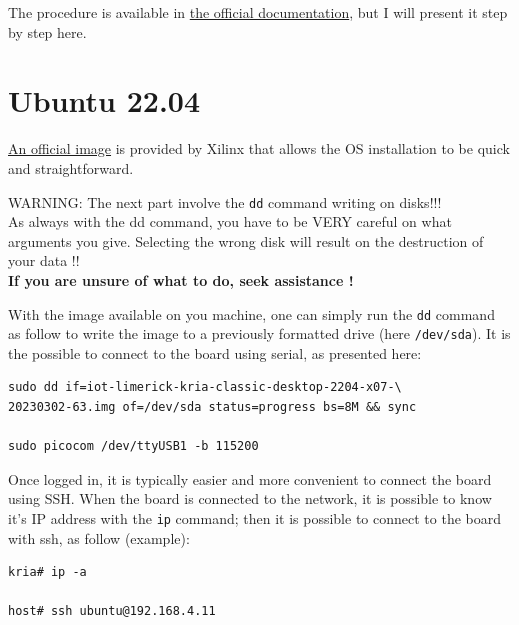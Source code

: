\documentclass[10pt]{article}
\begin{document}
The procedure is available in \href{https://docs.xilinx.com/r/en-US/ug1089-kv260-starter-kit/Firmware-Update}{the official documentation},
but I will present it step by step here.

\section{Ubuntu 22.04}
\label{sec:ubuntu-22.04}
\href{https://ubuntu.com/download/amd-xilinx}{An official image} is provided by Xilinx that allows the OS installation to be quick and
straightforward.

\begin{tcolorbox}[colback=red!5!white,colframe=red!75!black]
  WARNING: The next part involve the \verb|dd| command writing on disks!!! \\
  As always with the dd command, you have to be VERY careful on what arguments you give. Selecting the wrong disk will result on the destruction of your data !! \\
  \textbf{If you are unsure of what to do, seek assistance !}
\end{tcolorbox}


With the image available on you machine, one can simply run the \verb|dd| command as follow to write the image to a
previously formatted drive (here \verb|/dev/sda|). It is the possible to connect to the board using serial, as presented here:
\begin{tcolorbox}
\begin{verbatim}
sudo dd if=iot-limerick-kria-classic-desktop-2204-x07-\
20230302-63.img of=/dev/sda status=progress bs=8M && sync

sudo picocom /dev/ttyUSB1 -b 115200
\end{verbatim}
\end{tcolorbox}

Once logged in, it is typically easier and more convenient to connect the board using SSH.
When the board is connected to the network, it is possible to know it's IP address with
the \verb|ip| command; then it is possible to connect to the board with ssh, as follow (example):
\begin{tcolorbox}
\begin{verbatim}
kria# ip -a

host# ssh ubuntu@192.168.4.11
\end{verbatim}
\end{tcolorbox}
\end{document}
